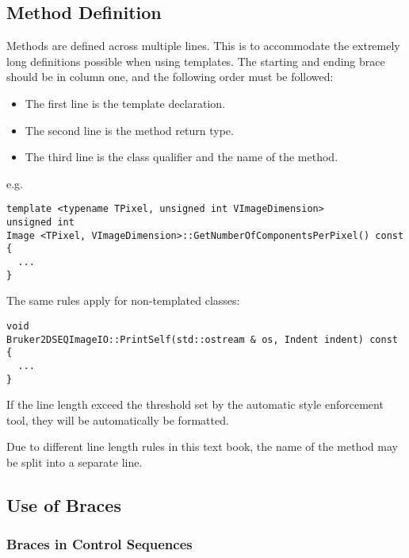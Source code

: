\subsection{Method Definition}
\label{subsec:MethodDefinition}

Methods are defined across multiple lines. This is to accommodate the extremely
long definitions possible when using templates. The starting and ending brace
should be in column one, and the following order must be followed:
\begin{itemize}
\item The first line is the template declaration.
\item The second line is the method return type.
\item The third line is the class qualifier and the name of the method.
\end{itemize}

e.g.

\small
\begin{verbatim}
template <typename TPixel, unsigned int VImageDimension>
unsigned int
Image <TPixel, VImageDimension>::GetNumberOfComponentsPerPixel() const
{
  ...
}
\end{verbatim}
\normalsize

The same rules apply for non-templated classes:

\small
\begin{verbatim}
void
Bruker2DSEQImageIO::PrintSelf(std::ostream & os, Indent indent) const
{
  ...
}
\end{verbatim}
\normalsize

If the line length exceed the threshold set by the automatic style
enforcement tool, they will be automatically be formatted.

Due to different line length rules in this text book, the name of the method
may be split into a separate line.


\subsection{Use of Braces}
\label{subsec:UseOfBraces}


\subsubsection{Braces in Control Sequences}
\label{subsubsec:BracesInControlSequences}

